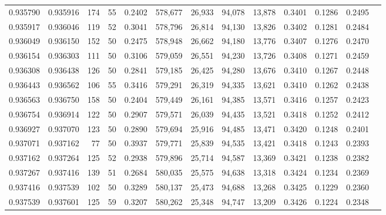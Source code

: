 \begin{tabular}{rrrrrrrrrrrrr}
0.935790 & 0.935916 &   174 &  55 &                                     0.2402 & 578,677 &  26,933 &  94,078 &  13,878 & 0.3401 & 0.1286 & 0.2495 \\
0.935917 & 0.936046 &   119 &  52 &                                     0.3041 & 578,796 &  26,814 &  94,130 &  13,826 & 0.3402 & 0.1281 & 0.2484 \\
0.936049 & 0.936150 &   152 &  50 &                                     0.2475 & 578,948 &  26,662 &  94,180 &  13,776 & 0.3407 & 0.1276 & 0.2470 \\
0.936154 & 0.936303 &   111 &  50 &                                     0.3106 & 579,059 &  26,551 &  94,230 &  13,726 & 0.3408 & 0.1271 & 0.2459 \\
0.936308 & 0.936438 &   126 &  50 &                                     0.2841 & 579,185 &  26,425 &  94,280 &  13,676 & 0.3410 & 0.1267 & 0.2448 \\
0.936443 & 0.936562 &   106 &  55 &                                     0.3416 & 579,291 &  26,319 &  94,335 &  13,621 & 0.3410 & 0.1262 & 0.2438 \\
0.936563 & 0.936750 &   158 &  50 &                                     0.2404 & 579,449 &  26,161 &  94,385 &  13,571 & 0.3416 & 0.1257 & 0.2423 \\
0.936754 & 0.936914 &   122 &  50 &                                     0.2907 & 579,571 &  26,039 &  94,435 &  13,521 & 0.3418 & 0.1252 & 0.2412 \\
0.936927 & 0.937070 &   123 &  50 &                                     0.2890 & 579,694 &  25,916 &  94,485 &  13,471 & 0.3420 & 0.1248 & 0.2401 \\
0.937071 & 0.937162 &    77 &  50 &                                     0.3937 & 579,771 &  25,839 &  94,535 &  13,421 & 0.3418 & 0.1243 & 0.2393 \\
0.937162 & 0.937264 &   125 &  52 &                                     0.2938 & 579,896 &  25,714 &  94,587 &  13,369 & 0.3421 & 0.1238 & 0.2382 \\
0.937267 & 0.937416 &   139 &  51 &                                     0.2684 & 580,035 &  25,575 &  94,638 &  13,318 & 0.3424 & 0.1234 & 0.2369 \\
0.937416 & 0.937539 &   102 &  50 &                                     0.3289 & 580,137 &  25,473 &  94,688 &  13,268 & 0.3425 & 0.1229 & 0.2360 \\
0.937539 & 0.937601 &   125 &  59 &                                     0.3207 & 580,262 &  25,348 &  94,747 &  13,209 & 0.3426 & 0.1224 & 0.2348 \\

\end{tabular}
